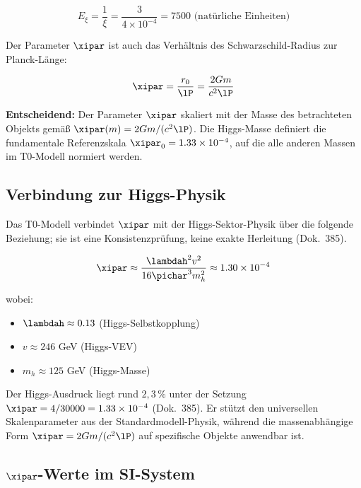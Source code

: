 	\begin{equation}
		E_\xi = \frac{1}{\xi} = \frac{3}{4 \times 10^{-4}} = 7500 \text{ (natürliche Einheiten)}
	\end{equation}
	
	Der Parameter $\xipar$ ist auch das Verhältnis des Schwarzschild-Radius zur Planck-Länge:
	
	\begin{equation}
		\xipar = \frac{r_0}{\lP} = \frac{2Gm}{c^2\lP}
		\label{eq:xi_definition}
	\end{equation}
	
\textbf{Entscheidend:} Der Parameter $\xipar$ skaliert mit der Masse des betrachteten Objekts gemäß $\xipar(m) = 2Gm/(c^2\lP)$. Die Higgs-Masse definiert die fundamentale Referenzskala $\xipar_0 = 1.33 \times 10^{-4}$, auf die alle anderen Massen im T0-Modell normiert werden.
	
	\subsection{Verbindung zur Higgs-Physik}
	\label{subsec:xi_higgs_verbindung}
	
	Das T0-Modell verbindet $\xipar$ mit der Higgs-Sektor-Physik über die folgende Beziehung; sie ist eine Konsistenzprüfung, keine exakte Herleitung (Dok.~385).
	
	\begin{equation}
		\xipar \approx \frac{\lambdah^2 v^2}{16\pichar^3 m_h^2} \approx 1.30 \times 10^{-4}
		\label{eq:xi_higgs_fundamental}
	\end{equation}
	
	wobei:
	\begin{itemize}
		\item $\lambdah \approx 0.13$ (Higgs-Selbstkopplung)
		\item $v \approx 246$ GeV (Higgs-VEV)
		\item $m_h \approx 125$ GeV (Higgs-Masse)
	\end{itemize}
	
	Der Higgs-Ausdruck liegt rund $2{,}3\,\%$ unter der Setzung $\xipar = 4/30000 = 1.33 \times 10^{-4}$ (Dok.~385). Er stützt den universellen Skalenparameter aus der Standardmodell-Physik, während die massenabhängige Form $\xipar = 2Gm/(c^2\lP)$ auf spezifische Objekte anwendbar ist.
	
	\subsection{$\xipar$-Werte im SI-System}
	\label{subsec:xi_si_werte}
	
